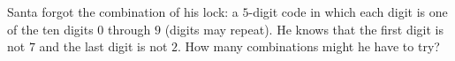Santa forgot the combination of his lock: a $5$-digit code in which each digit is one of the ten digits $0$ through $9$ (digits may repeat). He knows that the first digit is not $7$ and the last digit is not $2$. How many combinations might he have to try?
